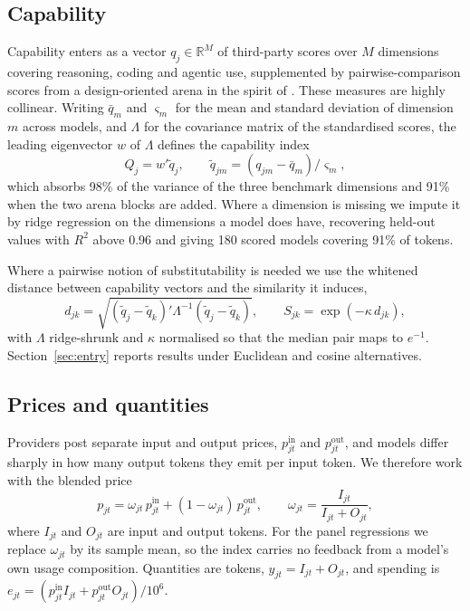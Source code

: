 \documentclass{article}
\newcommand{\Nscored}{180}
\newcommand{\CovScored}{91}
\newcommand{\PCone}{98}
\newcommand{\PCfive}{91}
\begin{document}
\subsection{Capability}

Capability enters as a vector $q_j \in \mathbb{R}^M$ of third-party scores over $M$
dimensions covering reasoning, coding and agentic use, supplemented by pairwise-comparison
scores from a design-oriented arena in the spirit of \citet{chiang2024}. These measures are
highly collinear. Writing $\bar q_m$ and $\varsigma_m$ for the mean and standard deviation of
dimension $m$ across models, and $\Lambda$ for the covariance matrix of the standardised
scores, the leading eigenvector $w$ of $\Lambda$ defines the capability index
\begin{equation}
Q_j = w' \tilde q_j , \qquad
\tilde q_{jm} = (q_{jm} - \bar q_m) / \varsigma_m ,
\label{eq:index}
\end{equation}
which absorbs \PCone\% of the variance of the three benchmark dimensions and \PCfive\%
when the two arena blocks are added. Where a dimension is missing we impute it by ridge
regression on the dimensions a model does have, recovering held-out values with $R^2$ above
0.96 and giving \Nscored{} scored models covering \CovScored\% of tokens.

Where a pairwise notion of substitutability is needed we use the whitened distance
between capability vectors and the similarity it induces,
\begin{equation}
d_{jk} = \sqrt{(\tilde q_j - \tilde q_k)' \Lambda^{-1} (\tilde q_j - \tilde q_k)} ,
\qquad
S_{jk} = \exp(-\kappa \, d_{jk}) ,
\label{eq:similarity}
\end{equation}
with $\Lambda$ ridge-shrunk and $\kappa$ normalised so that the median pair maps to
$e^{-1}$. Section~\ref{sec:entry} reports results under Euclidean and cosine
alternatives.

\subsection{Prices and quantities}

Providers post separate input and output prices, $p^{\text{in}}_{jt}$ and
$p^{\text{out}}_{jt}$, and models differ sharply in how many output tokens they emit per
input token. We therefore work with the blended price
\begin{equation}
p_{jt} = \omega_{jt} \, p^{\text{in}}_{jt} + (1 - \omega_{jt}) \, p^{\text{out}}_{jt} ,
\qquad
\omega_{jt} = \frac{I_{jt}}{I_{jt} + O_{jt}} ,
\label{eq:price}
\end{equation}
where $I_{jt}$ and $O_{jt}$ are input and output tokens. For the panel regressions we
replace $\omega_{jt}$ by its sample mean, so the index carries no feedback from a model's
own usage composition. Quantities are tokens, $y_{jt} = I_{jt} + O_{jt}$, and spending is
$e_{jt} = (p^{\text{in}}_{jt} I_{jt} + p^{\text{out}}_{jt} O_{jt})/10^6$.
\end{document}

